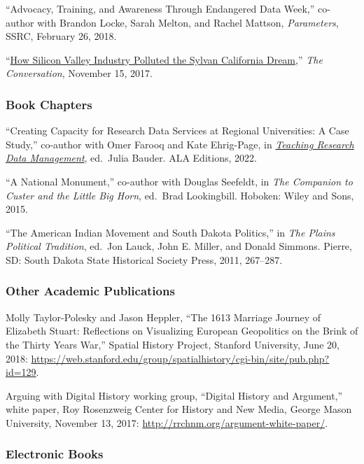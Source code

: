 ``Advocacy, Training, and Awareness Through Endangered Data Week,''
co-author with Brandon Locke, Sarah Melton, and Rachel Mattson,
\emph{Parameters}, SSRC, February 26, 2018.

``\href{https://theconversation.com/how-silicon-valley-industry-polluted-the-sylvan-california-dream-85810}{How
Silicon Valley Industry Polluted the Sylvan California Dream},''
\emph{The Conversation}, November 15, 2017.

\hypertarget{book-chapters}{%
\subsubsection{Book Chapters}\label{book-chapters}}

``Creating Capacity for Research Data Services at Regional Universities:
A Case Study,'' co-author with Omer Farooq and Kate Ehrig-Page, in
\emph{\href{https://www.alastore.ala.org/trdm}{Teaching Research Data
Management}}, ed.~Julia Bauder. ALA Editions, 2022.

``A National Monument,'' co-author with Douglas Seefeldt, in \emph{The
Companion to Custer and the Little Big Horn}, ed.~Brad Lookingbill.
Hoboken: Wiley and Sons, 2015.

``The American Indian Movement and South Dakota Politics,'' in \emph{The
Plains Political Tradition}, ed.~Jon Lauck, John E. Miller, and Donald
Simmons. Pierre, SD: South Dakota State Historical Society Press, 2011,
267--287.

\hypertarget{other-academic-publications}{%
\subsubsection{Other Academic
Publications}\label{other-academic-publications}}

Molly Taylor-Polesky and Jason Heppler, ``The 1613 Marriage Journey of
Elizabeth Stuart: Reflections on Visualizing European Geopolitics on the
Brink of the Thirty Years War,'' Spatial History Project, Stanford
University, June 20, 2018:
\url{https://web.stanford.edu/group/spatialhistory/cgi-bin/site/pub.php?id=129}.

Arguing with Digital History working group, ``Digital History and
Argument,'' white paper, Roy Rosenzweig Center for History and New
Media, George Mason University, November 13, 2017:
\url{http://rrchnm.org/argument-white-paper/}.

\hypertarget{electronic-books}{%
\subsubsection{Electronic Books}\label{electronic-books}}

